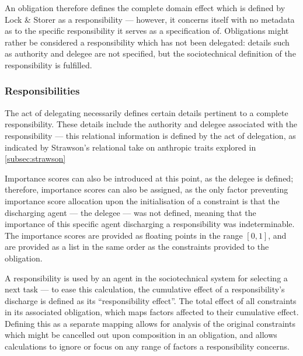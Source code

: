 An obligation therefore defines the complete domain effect which is defined by Lock \& Storer as a responsibility --- however, it concerns itself with no metadata as to the specific responsibility it serves as a specification of. Obligations might rather be considered a responsibility which has not been delegated: details such as authority and delegee are not specified, but the sociotechnical definition of the responsibility is fulfilled.\par

\subsubsection{Responsibilities}\label{subsec:responsibilities}  %
The act of delegating necessarily defines certain details pertinent to a complete responsibility. These details include the authority and delegee associated with the responsibility --- this relational information is defined by the act of delegation, as indicated by Strawson's relational take on anthropic traits explored in \cref{subsec:strawson}\par

Importance scores can also be introduced at this point, as the delegee is defined; therefore, importance scores can also be assigned, as the only factor preventing importance score allocation upon the initialisation of a constraint is that the discharging agent --- the delegee --- was not defined, meaning that the importance of this specific agent discharging a responsibility was indeterminable. The importance scores are provided as floating points in the range \([0,1]\), and are provided as a list in the same order as the constraints provided to the obligation.\par

A responsibility is used by an agent in the sociotechnical system for selecting a next task --- to ease this calculation, the cumulative effect of a responsibility's discharge is defined as its ``responsibility effect''. The total effect of all constraints in its associated obligation, which maps factors affected to their cumulative effect. Defining this as a separate mapping allows for analysis of the original constraints which might be cancelled out upon composition in an obligation, and allows calculations to ignore or focus on any range of factors a responsibility concerns.\par

